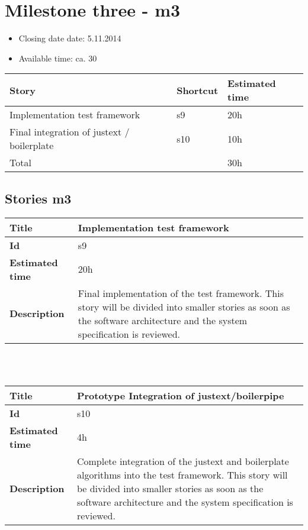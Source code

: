 \section{Milestone three - m3}

\begin{itemize}
\item Closing date date: 5.11.2014
\item Available time: ca. 30
\end{itemize}

    \begin{tabular}{ | p{10cm} | p{2cm} | p{2cm} |}
    \hline
    \textbf{Story} & \textbf{Shortcut}& \textbf{Estimated time} \\ \hline
    Implementation test framework & s9 & 20h \\
    Final integration of justext / boilerplate & s10 & 10h \\ \hline
    Total &  & 30h\\
    \hline
    \end{tabular}

\subsection {Stories m3}

    \begin{tabular}{ | p{4cm} | p{10cm} |}
    \hline
    \textbf{Title} & Implementation test framework \\ \hline
    \textbf{Id} & s9\\ \hline
    \textbf{Estimated time} & 20h \\ \hline
    \textbf{Description} & Final implementation of the test framework. 
    This story will be divided into smaller stories as soon as the software architecture and the system specification is reviewed.\\ 
    \hline
    \end{tabular} \\\\


    \begin{tabular}{ | p{4cm} | p{10cm} |}
    \hline
    \textbf{Title} & Prototype Integration of justext/boilerpipe\\ \hline
    \textbf{Id} & s10\\ \hline
    \textbf{Estimated time} & 4h \\ \hline
    \textbf{Description} &  Complete integration of the justext and boilerplate algorithms into the test framework. 
    This story will be divided into smaller stories as soon as the software architecture and the system specification is reviewed.\\ 
    \hline
    \end{tabular} \\\\





